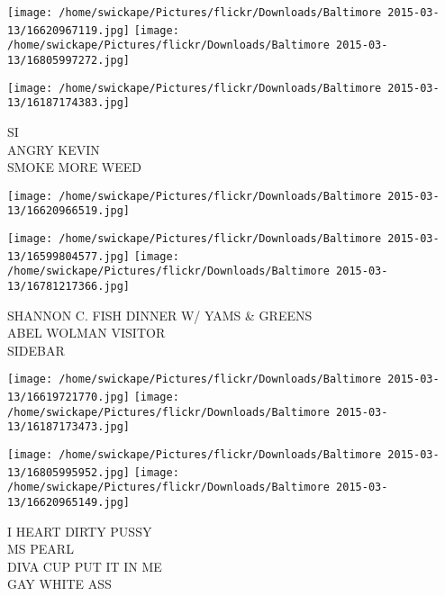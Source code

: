 \documentclass[10pt,letterpaper]{article}
\begin{document}
\texttt{[image: /home/swickape/Pictures/flickr/Downloads/Baltimore 2015-03-13/16620967119.jpg]}
\texttt{[image: /home/swickape/Pictures/flickr/Downloads/Baltimore 2015-03-13/16805997272.jpg]}

\texttt{[image: /home/swickape/Pictures/flickr/Downloads/Baltimore 2015-03-13/16187174383.jpg]}

SI\\
ANGRY KEVIN\\
SMOKE MORE WEED
\pagebreak

\texttt{[image: /home/swickape/Pictures/flickr/Downloads/Baltimore 2015-03-13/16620966519.jpg]}

\vspace{0.25in}
\texttt{[image: /home/swickape/Pictures/flickr/Downloads/Baltimore 2015-03-13/16599804577.jpg]}
\texttt{[image: /home/swickape/Pictures/flickr/Downloads/Baltimore 2015-03-13/16781217366.jpg]}

SHANNON C. FISH DINNER W/ YAMS \& GREENS\\
ABEL WOLMAN VISITOR\\
SIDEBAR
\pagebreak

\texttt{[image: /home/swickape/Pictures/flickr/Downloads/Baltimore 2015-03-13/16619721770.jpg]}
\texttt{[image: /home/swickape/Pictures/flickr/Downloads/Baltimore 2015-03-13/16187173473.jpg]}

\texttt{[image: /home/swickape/Pictures/flickr/Downloads/Baltimore 2015-03-13/16805995952.jpg]}
\texttt{[image: /home/swickape/Pictures/flickr/Downloads/Baltimore 2015-03-13/16620965149.jpg]}

I HEART DIRTY PUSSY\\
MS PEARL\\
DIVA CUP PUT IT IN ME\\
GAY WHITE ASS
\pagebreak
\end{document}
